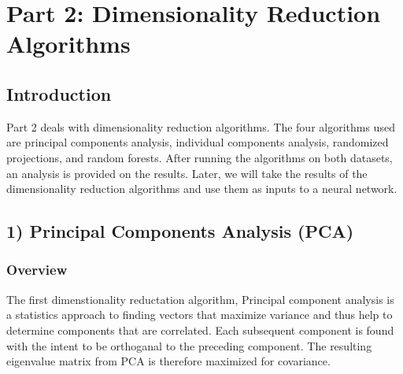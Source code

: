 \documentclass[h]{article}
\begin{document}
 
\section*{Part 2: Dimensionality Reduction Algorithms}
\subsection*{ Introduction}  
Part 2 deals with dimensionality reduction algorithms.  The four algorithms used 
are principal components analysis, individual components analysis, randomized projections, and random 
forests.  After running the algorithms on both datasets, an analysis is provided 
on the results.  Later, we will take the results of the dimensionality reduction 
algorithms and use them as inputs to a neural network.

\subsection*{1) Principal Components Analysis (PCA)}  
\subsubsection*{Overview}
The first dimenstionality reductation algorithm, Principal component analysis is a statistics approach to finding vectors that 
maximize variance and thus help to determine components that are correlated.  Each subsequent component is found with the intent to be 
orthoganal to the preceding component.  The resulting eigenvalue matrix from PCA 
is therefore maximized for covariance.
\end{document}
